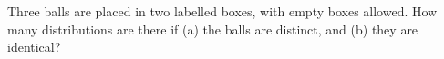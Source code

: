Three balls are placed in two labelled boxes, with empty boxes allowed. How many distributions are there if (a) the balls are distinct, and (b) they are identical?
